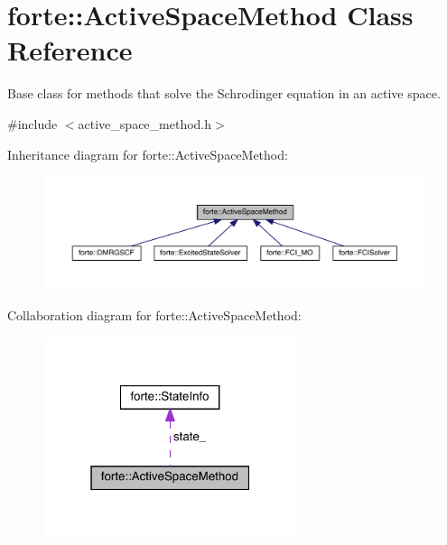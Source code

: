 \hypertarget{classforte_1_1_active_space_method}{}\section{forte\+:\+:Active\+Space\+Method Class Reference}
\label{classforte_1_1_active_space_method}


Base class for methods that solve the Schrodinger equation in an active space.  




{\ttfamily \#include $<$active\+\_\+space\+\_\+method.\+h$>$}



Inheritance diagram for forte\+:\+:Active\+Space\+Method\+:
\nopagebreak
\begin{figure}[H]
\begin{center}
\leavevmode
\includegraphics[width=350pt]{classforte_1_1_active_space_method__inherit__graph}
\end{center}
\end{figure}


Collaboration diagram for forte\+:\+:Active\+Space\+Method\+:
\nopagebreak
\begin{figure}[H]
\begin{center}
\leavevmode
\includegraphics[width=211pt]{classforte_1_1_active_space_method__coll__graph}
\end{center}
\end{figure}
